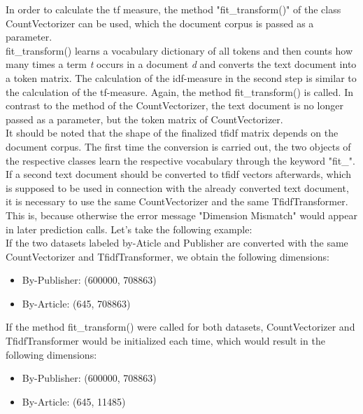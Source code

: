 \documentclass[a4paper, 11pt,titlepage,oneside,openany]{book}
\begin{document}
In order to calculate the \gls{tf} measure, the method "fit\_transform()" of the class CountVectorizer can be used, which the document corpus is passed as a parameter. \\
\noindent fit\_transform() learns a vocabulary dictionary of all tokens and then counts how many times a term \textit{t} occurs in a document \textit{d} and converts the text document into a token matrix.
\noindent The calculation of the \gls{idf}-measure in the second step is similar to the calculation of the \gls{tf}-measure. Again, the method fit\_transform() is called. In contrast to the method of the CountVectorizer, the text document is no longer passed as a parameter, but the token matrix of CountVectorizer. \\
\indent It should be noted that the shape of the finalized \gls{tfidf} matrix depends on the document corpus. The first time the conversion is carried out, the two objects of the respective classes learn the respective vocabulary through the keyword "fit\_". If a second text document should be converted to \gls{tfidf} vectors afterwards, which is supposed to be used in connection with the already converted text document, it is necessary to use the same CountVectorizer and the same TfidfTransformer. This is, because otherwise the error message "Dimension Mismatch" would appear in later prediction calls.
Let's take the following example: \\
\noindent If the two datasets labeled by-Aticle and Publisher are converted with the same CountVectorizer and TfidfTransformer, we obtain the following dimensions:
\begin{itemize}
	\item By-Publisher: (600000, 708863)
	\item By-Article: (645, 708863)	
\end{itemize}
\noindent If the method fit\_transform() were called for both datasets, CountVectorizer and TfidfTransformer would be initialized each time, which would result in the following dimensions:
\begin{itemize}
	\item By-Publisher: (600000, 708863)
	\item By-Article: (645, 11485)	
\end{itemize}


\newpage
\end{document}
